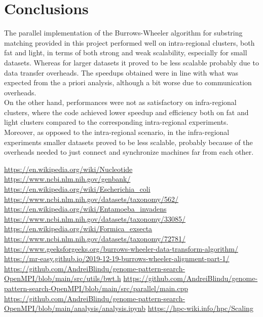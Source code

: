 \documentclass[final,5p,times,twocolumn,authoryear]{elsarticle}
\begin{document}
\section{Conclusions}
The parallel implementation of the Burrows-Wheeler algorithm for substring matching provided in this project performed well on intra-regional clusters, both fat and light, in terms of both strong and weak scalability, especially for small datasets. Whereas for larger datasets it proved to be less scalable probably due to data transfer overheads. The speedups obtained were in line with what was expected from the a priori analysis, although a bit worse due to communication overheads. \\
On the other hand, performances were not as satisfactory on infra-regional clusters, where the code achieved lower speedup and efficiency both on fat and light clusters compared to the corresponding intra-regional experiments. Moreover, as opposed to the intra-regional scenario, in the infra-regional experiments smaller datasets proved to be less scalable, probably because of the overheads needed to just connect and synchronize machines far from each other.


\begin{thebibliography}{9}
 \url{https://en.wikipedia.org/wiki/Nucleotide}
 \url{https://www.ncbi.nlm.nih.gov/genbank/}
 \url{https://en.wikipedia.org/wiki/Escherichia_coli}
 \url{https://www.ncbi.nlm.nih.gov/datasets/taxonomy/562/}
 \url{https://en.wikipedia.org/wiki/Entamoeba_invadens}
 \url{https://www.ncbi.nlm.nih.gov/datasets/taxonomy/33085/}
 \url{https://en.wikipedia.org/wiki/Formica_exsecta}
 \url{https://www.ncbi.nlm.nih.gov/datasets/taxonomy/72781/}
\url{https://www.geeksforgeeks.org/burrows-wheeler-data-transform-algorithm/}
\url{https://mr-easy.github.io/2019-12-19-burrows-wheeler-alignment-part-1/}
\url{https://github.com/AndreiBlindu/genome-pattern-search-OpenMPI/blob/main/src/utils/bwt.h}
\url{https://github.com/AndreiBlindu/genome-pattern-search-OpenMPI/blob/main/src/parallel/main.cpp}
\url{https://github.com/AndreiBlindu/genome-pattern-search-OpenMPI/blob/main/analysis/analysis.ipynb}
\url{https://hpc-wiki.info/hpc/Scaling}
\end{thebibliography}
\end{document}
